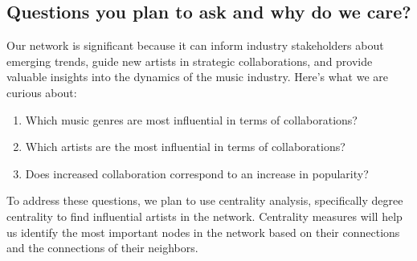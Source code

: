 \documentclass[10pt]{article}
\begin{document}
\subsection*{Questions you plan to ask and why do we care?}
Our network is significant because it can inform industry stakeholders about emerging trends, guide new artists in strategic collaborations, and provide valuable insights into the dynamics of the music industry.
Here’s what we are curious about: 
\begin{enumerate}
      \item Which music genres are most influential in terms of collaborations? 
      \item Which artists are the most influential in terms of collaborations?
      \item Does increased collaboration correspond to an increase in popularity?
\end{enumerate}
To address these questions, we plan to use centrality analysis, specifically degree centrality to find influential artists in the network. Centrality measures will help us identify the most important nodes in the network based on their connections and the connections of their neighbors.
\end{document}
